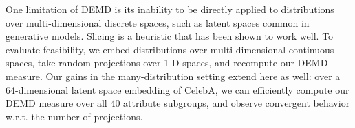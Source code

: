One limitation of DEMD
is its inability to be directly applied to distributions over multi-dimensional discrete spaces, such as latent spaces common in generative models. 
Slicing is a heuristic that has been shown to work well. To evaluate feasibility, we embed distributions over multi-dimensional continuous spaces, take random projections over 1-D spaces, and recompute our DEMD measure. Our gains in the many-distribution setting extend here as well: over a 64-dimensional latent space embedding of CelebA, we can efficiently compute our DEMD measure over all 40 attribute subgroups, and observe convergent behavior w.r.t. the number of projections.%



